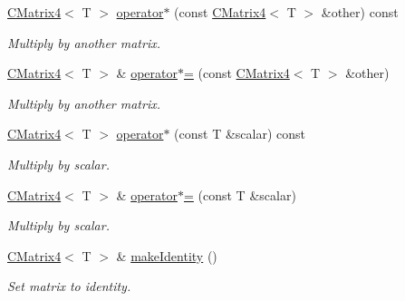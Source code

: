\begin{DoxyCompactItemize}
\hyperlink{classirr_1_1core_1_1CMatrix4}{C\+Matrix4}$<$ T $>$ \hyperlink{classirr_1_1core_1_1CMatrix4_a749eaef2610aa636e50c28aaad8fe075}{operator$\ast$} (const \hyperlink{classirr_1_1core_1_1CMatrix4}{C\+Matrix4}$<$ T $>$ \&other) const
\begin{DoxyCompactList}\small\item\em Multiply by another matrix. \end{DoxyCompactList}\item 
\hyperlink{classirr_1_1core_1_1CMatrix4}{C\+Matrix4}$<$ T $>$ \& \hyperlink{classirr_1_1core_1_1CMatrix4_a223e7cefd4428f57affb0713bd849e46}{operator$\ast$=} (const \hyperlink{classirr_1_1core_1_1CMatrix4}{C\+Matrix4}$<$ T $>$ \&other)
\begin{DoxyCompactList}\small\item\em Multiply by another matrix. \end{DoxyCompactList}\item 
\mbox{\label{classirr_1_1core_1_1CMatrix4_aed5dc4e442689760c65a7e8a7a84a3a6}} 
\hyperlink{classirr_1_1core_1_1CMatrix4}{C\+Matrix4}$<$ T $>$ \hyperlink{classirr_1_1core_1_1CMatrix4_aed5dc4e442689760c65a7e8a7a84a3a6}{operator$\ast$} (const T \&scalar) const
\begin{DoxyCompactList}\small\item\em Multiply by scalar. \end{DoxyCompactList}\item 
\mbox{\label{classirr_1_1core_1_1CMatrix4_a3cefd30e6839406f9887f69cd49b6dc7}} 
\hyperlink{classirr_1_1core_1_1CMatrix4}{C\+Matrix4}$<$ T $>$ \& \hyperlink{classirr_1_1core_1_1CMatrix4_a3cefd30e6839406f9887f69cd49b6dc7}{operator$\ast$=} (const T \&scalar)
\begin{DoxyCompactList}\small\item\em Multiply by scalar. \end{DoxyCompactList}\item 
\mbox{\label{classirr_1_1core_1_1CMatrix4_a46812f251d4c7ba8673e8b59832bcbe1}} 
\hyperlink{classirr_1_1core_1_1CMatrix4}{C\+Matrix4}$<$ T $>$ \& \hyperlink{classirr_1_1core_1_1CMatrix4_a46812f251d4c7ba8673e8b59832bcbe1}{make\+Identity} ()
\begin{DoxyCompactList}\small\item\em Set matrix to identity. \end{DoxyCompactList}\item 

\end{DoxyCompactItemize}

